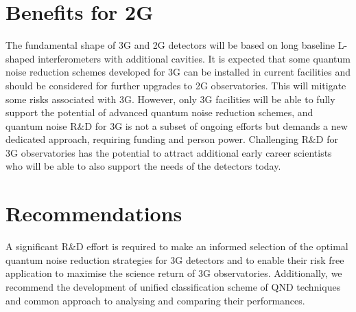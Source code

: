 \section{Benefits for 2G} 
The fundamental shape of 3G and 2G detectors will be based on long baseline L-shaped interferometers with additional cavities. It is expected that some quantum noise reduction schemes developed for 3G can be installed in current facilities and should be considered for further upgrades to 2G observatories. This will mitigate some risks associated with 3G. However, only 3G facilities will be able to fully support the potential of advanced quantum noise reduction schemes, and quantum noise R\&D for 3G is not a subset of ongoing efforts but demands a new dedicated approach, requiring funding and person power. Challenging R\&D for 3G observatories has the potential to attract additional early career scientists who will be able to also support the needs of the detectors today. 

\section{Recommendations}
A significant R\&D effort is required to make an informed selection of the optimal quantum noise reduction strategies for 3G detectors and to enable their risk free application to maximise the science return of 3G observatories. Additionally, we recommend the development of unified classification scheme of QND techniques and common approach to analysing and comparing their performances.  



